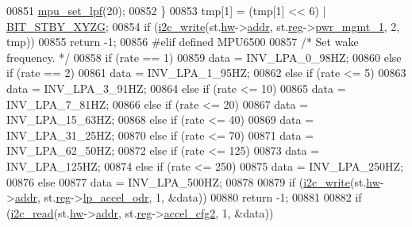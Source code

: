 \begin{DoxyCode}
{{{{00851         \hyperlink{group___d_r_i_v_e_r_s_ga5661a9dee25152166769910767a2a93d}{mpu\_set\_lpf}(20);
00852     \}
00853     tmp[1] = (tmp[1] << 6) | \hyperlink{inv__mpu_8c_a4e2ef22b94b90f9b83394dfe1f688ce4}{BIT\_STBY\_XYZG};
00854     \textcolor{keywordflow}{if} (\hyperlink{_i2_c_8c_ac0f145afe8d662af199043939f4398d6}{i2c\_write}(st.\hyperlink{structgyro__state__s_a5bac30a96752691e4cc723735060e360}{hw}->\hyperlink{structhw__s_a4c34a946600e9d68b6355d23f54d291b}{addr}, st.\hyperlink{structgyro__state__s_ae857e1285c583b7438a208edd691a38e}{reg}->\hyperlink{structgyro__reg__s_ad746a196c317f0f4d557a92b9eb98d34}{pwr\_mgmt\_1}, 2, tmp))
00855         \textcolor{keywordflow}{return} -1;
00856 \textcolor{preprocessor}{#elif defined MPU6500}
00857     \textcolor{comment}{/* Set wake frequency. */}
00858     \textcolor{keywordflow}{if} (rate == 1)
00859         data = INV\_LPA\_0\_98HZ;
00860     \textcolor{keywordflow}{else} \textcolor{keywordflow}{if} (rate == 2)
00861         data = INV\_LPA\_1\_95HZ;
00862     \textcolor{keywordflow}{else} \textcolor{keywordflow}{if} (rate <= 5)
00863         data = INV\_LPA\_3\_91HZ;
00864     \textcolor{keywordflow}{else} \textcolor{keywordflow}{if} (rate <= 10)
00865         data = INV\_LPA\_7\_81HZ;
00866     \textcolor{keywordflow}{else} \textcolor{keywordflow}{if} (rate <= 20)
00867         data = INV\_LPA\_15\_63HZ;
00868     \textcolor{keywordflow}{else} \textcolor{keywordflow}{if} (rate <= 40)
00869         data = INV\_LPA\_31\_25HZ;
00870     \textcolor{keywordflow}{else} \textcolor{keywordflow}{if} (rate <= 70)
00871         data = INV\_LPA\_62\_50HZ;
00872     \textcolor{keywordflow}{else} \textcolor{keywordflow}{if} (rate <= 125)
00873         data = INV\_LPA\_125HZ;
00874     \textcolor{keywordflow}{else} \textcolor{keywordflow}{if} (rate <= 250)
00875         data = INV\_LPA\_250HZ;
00876     \textcolor{keywordflow}{else}
00877         data = INV\_LPA\_500HZ;
00878 
00879     \textcolor{keywordflow}{if} (\hyperlink{_i2_c_8c_ac0f145afe8d662af199043939f4398d6}{i2c\_write}(st.\hyperlink{structgyro__state__s_a5bac30a96752691e4cc723735060e360}{hw}->\hyperlink{structhw__s_a4c34a946600e9d68b6355d23f54d291b}{addr}, st.\hyperlink{structgyro__state__s_ae857e1285c583b7438a208edd691a38e}{reg}->\hyperlink{structgyro__reg__s_a14a0bff136c827f3f58f619f8045788b}{lp\_accel\_odr}, 1, &data))
00880         \textcolor{keywordflow}{return} -1;
00881 
00882     \textcolor{keywordflow}{if} (\hyperlink{_i2_c_8c_ac2d47e7a6c76f93f9b537c31a2986e7b}{i2c\_read}(st.\hyperlink{structgyro__state__s_a5bac30a96752691e4cc723735060e360}{hw}->\hyperlink{structhw__s_a4c34a946600e9d68b6355d23f54d291b}{addr}, st.\hyperlink{structgyro__state__s_ae857e1285c583b7438a208edd691a38e}{reg}->\hyperlink{structgyro__reg__s_a4878318dd0c9243015d4963e00b2d954}{accel\_cfg2}, 1, &data))
}}}}
\end{DoxyCode}
